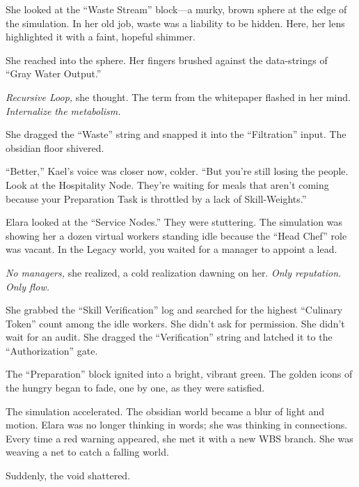 She looked at the ``Waste Stream'' block—a murky, brown sphere at the edge of the simulation. In her old job, waste was a liability to be hidden. Here, her lens highlighted it with a faint, hopeful shimmer. 

She reached into the sphere. Her fingers brushed against the data-strings of ``Gray Water Output.'' 

\textit{Recursive Loop,} she thought. The term from the whitepaper flashed in her mind. \textit{Internalize the metabolism.}

She dragged the ``Waste'' string and snapped it into the ``Filtration'' input. The obsidian floor shivered. 


``Better,'' Kael's voice was closer now, colder. ``But you’re still losing the people. Look at the Hospitality Node. They’re waiting for meals that aren't coming because your Preparation Task is throttled by a lack of Skill-Weights.''

Elara looked at the ``Service Nodes.'' They were stuttering. The simulation was showing her a dozen virtual workers standing idle because the ``Head Chef'' role was vacant. In the Legacy world, you waited for a manager to appoint a lead. 

\textit{No managers,} she realized, a cold realization dawning on her. \textit{Only reputation. Only flow.}

She grabbed the ``Skill Verification'' log and searched for the highest ``Culinary Token'' count among the idle workers. She didn't ask for permission. She didn't wait for an audit. She dragged the ``Verification'' string and latched it to the ``Authorization'' gate. 

The ``Preparation'' block ignited into a bright, vibrant green. The golden icons of the hungry began to fade, one by one, as they were satisfied. 



The simulation accelerated. The obsidian world became a blur of light and motion. Elara was no longer thinking in words; she was thinking in connections. Every time a red warning appeared, she met it with a new WBS branch. She was weaving a net to catch a falling world.

Suddenly, the void shattered. 


